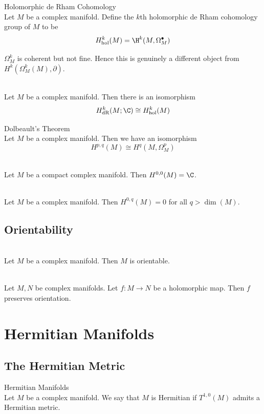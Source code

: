 \documentclass[a4paper]{article}
\begin{document}
\begin{defn}{Holomorphic de Rham Cohomology}{}\\
Let $M$ be a complex manifold. Define the $k$th holomorphic de Rham cohomology group of $M$ to be $$H_\text{hol}^k(M)=\H^k(M,\Omega_M^\bullet)$$
\end{defn}

$\Omega_M^k$ is coherent but not fine. Hence this is genuinely a different object from $H^k(\Omega_M^k(M),\partial)$. 

\begin{prp}{}{}\\
Let $M$ be a complex manifold. Then there is an isomorphism $$H_\text{dR}^k(M;\C)\cong H_\text{hol}^k(M)$$
\end{prp}

\begin{thm}{Dolbeault's Theorem}{}\\
Let $M$ be a complex manifold. Then we have an isomorphism $$H^{p,q}(M)\cong H^q(M,\Omega_M^p)$$
\end{thm}

\begin{crl}{}{}\\
Let $M$ be a compact complex manifold. Then $H^{0,0}(M)=\C$. 
\end{crl}

\begin{lmm}{}{}\\
Let $M$ be a complex manifold. Then $H^{0,q}(M)=0$ for all $q>\dim(M)$. 
\end{lmm}

\subsection{Orientability}
\begin{prp}{}{}\\
Let $M$ be a complex manifold. Then $M$ is orientable. 
\end{prp}

\begin{crl}{}{}\\
Let $M,N$ be complex manifolds. Let $f:M\to N$ be a holomorphic map. Then $f$ preserves orientation. 
\end{crl}


\pagebreak
\section{Hermitian Manifolds}
\subsection{The Hermitian Metric}
\begin{defn}{Hermitian Manifolds}{}\\
Let $M$ be a complex manifold. We say that $M$ is Hermitian if $T^{1,0}(M)$ admits a Hermitian metric. 
\end{defn}
\end{document}
